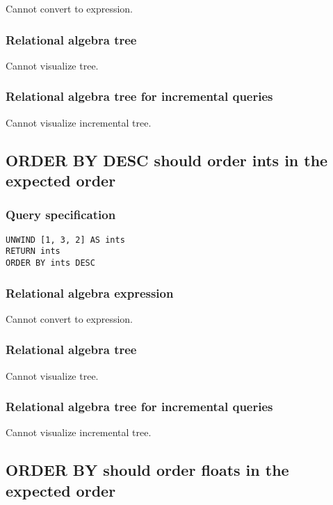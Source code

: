 Cannot convert to expression.

\subsubsection*{Relational algebra tree}

Cannot visualize tree.

\subsubsection*{Relational algebra tree for incremental queries}

Cannot visualize incremental tree.

\subsection{ORDER BY DESC should order ints in the expected order}

\subsubsection*{Query specification}

\begin{lstlisting}
UNWIND [1, 3, 2] AS ints
RETURN ints
ORDER BY ints DESC
\end{lstlisting}

\subsubsection*{Relational algebra expression}

Cannot convert to expression.

\subsubsection*{Relational algebra tree}

Cannot visualize tree.

\subsubsection*{Relational algebra tree for incremental queries}

Cannot visualize incremental tree.

\subsection{ORDER BY should order floats in the expected order}

